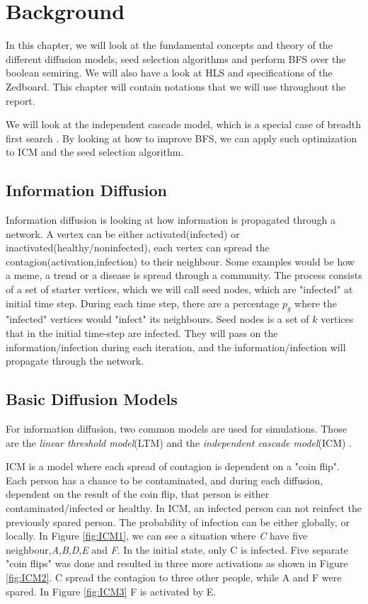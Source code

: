 \chapter{Background} \label{background}

In this chapter, we will look at the fundamental concepts and theory of the different diffusion models, seed selection algorithms and perform BFS over the boolean semiring. We will also have a look at HLS and specifications of the Zedboard. This chapter will contain notations that we will use throughout the report.

 We will look at the independent cascade model, which is a special case of breadth first search  \cite{HybridBFS2015}. By looking at how to improve BFS, we can apply such optimization to ICM and the seed selection algorithm.
 \\
 

\section{Information Diffusion}
Information diffusion is looking at how information is propagated through a network. A vertex can be either activated(infected) or inactivated(healthy/noninfected), each vertex can spread the contagion(activation,infection) to their neighbour. Some examples would be how a meme, a trend or a disease is spread through a community. The process consists of a set of starter vertices, which we will call seed nodes, which are "infected" at initial time step. During each time step, there are a percentage $p_g$ where the "infected" vertices would "infect" its neighbours. Seed nodes is a set of $k$ vertices that in the initial time-step are infected. They will pass on the information/infection during each iteration, and the information/infection will propagate through the network. 

 
\section{Basic Diffusion Models}
For information diffusion, two common models are used for simulations. Those are the \textit{linear threshold model}(LTM) and the \textit{independent cascade model}(ICM) \cite{MaximizeSpread2003}.

ICM is a model where each spread of contagion is dependent on a "coin flip". Each person has a chance to be contaminated, and during each diffusion, dependent on the result of the coin flip, that person is either contaminated/infected or healthy. In ICM, an infected person can not reinfect the previously spared person. The probability of infection can be either globally, or locally. In Figure \ref{fig:ICM1}, we can see a situation where \textit{C} have five neighbour,\textit{A},\textit{B},\textit{D},\textit{E} and \textit{F}. In the initial state, only C is infected. Five separate "coin flips" was done and resulted in three more activations as shown in Figure \ref{fig:ICM2}. C spread the contagion to three other people, while A and F were spared. In Figure \ref{fig:ICM3} F is activated by E. 

